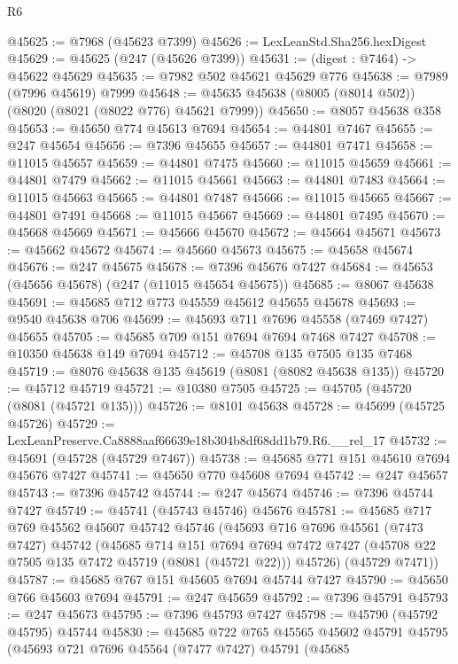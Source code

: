 \begin{lexlean}{R6}
\begin{coremodule}
@45625 := @7968 (@45623 @7399)
@45626 := LexLeanStd.Sha256.hexDigest
@45629 := @45625 (@247 (@45626 @7399))
@45631 := (digest : @7464) -> @45622 @45629
@45635 := @7982 @502 @45621 @45629 @776
@45638 := @7989 (@7996 @45619) @7999
@45648 := @45635 @45638 (@8005 (@8014 @502)) (@8020 (@8021 (@8022 @776) @45621 @7999))
@45650 := @8057 @45638 @358
@45653 := @45650 @774 @45613 @7694
@45654 := @44801 @7467
@45655 := @247 @45654
@45656 := @7396 @45655
@45657 := @44801 @7471
@45658 := @11015 @45657
@45659 := @44801 @7475
@45660 := @11015 @45659
@45661 := @44801 @7479
@45662 := @11015 @45661
@45663 := @44801 @7483
@45664 := @11015 @45663
@45665 := @44801 @7487
@45666 := @11015 @45665
@45667 := @44801 @7491
@45668 := @11015 @45667
@45669 := @44801 @7495
@45670 := @45668 @45669
@45671 := @45666 @45670
@45672 := @45664 @45671
@45673 := @45662 @45672
@45674 := @45660 @45673
@45675 := @45658 @45674
@45676 := @247 @45675
@45678 := @7396 @45676 @7427
@45684 := @45653 (@45656 @45678) (@247 (@11015 @45654 @45675))
@45685 := @8067 @45638
@45691 := @45685 @712 @773 @45559 @45612 @45655 @45678
@45693 := @9540 @45638 @706
@45699 := @45693 @711 @7696 @45558 (@7469 @7427) @45655
@45705 := @45685 @709 @151 @7694 @7694 @7468 @7427
@45708 := @10350 @45638 @149 @7694
@45712 := @45708 @135 @7505 @135 @7468
@45719 := @8076 @45638 @135 @45619 (@8081 (@8082 @45638 @135))
@45720 := @45712 @45719
@45721 := @10380 @7505
@45725 := @45705 (@45720 (@8081 (@45721 @135)))
@45726 := @8101 @45638
@45728 := @45699 (@45725 @45726)
@45729 := LexLeanPreserve.Ca8888aaf66639e18b304b8df68dd1b79.R6.__rel_17
@45732 := @45691 (@45728 (@45729 @7467))
@45738 := @45685 @771 @151 @45610 @7694 @45676 @7427
@45741 := @45650 @770 @45608 @7694
@45742 := @247 @45657
@45743 := @7396 @45742
@45744 := @247 @45674
@45746 := @7396 @45744 @7427
@45749 := @45741 (@45743 @45746) @45676
@45781 := @45685
    @717
    @769
    @45562
    @45607
    @45742
    @45746
    (@45693
      @716
      @7696
      @45561
      (@7473 @7427)
      @45742
      (@45685
        @714
        @151
        @7694
        @7694
        @7472
        @7427
        (@45708 @22 @7505 @135 @7472 @45719 (@8081 (@45721 @22)))
        @45726)
      (@45729 @7471))
@45787 := @45685 @767 @151 @45605 @7694 @45744 @7427
@45790 := @45650 @766 @45603 @7694
@45791 := @247 @45659
@45792 := @7396 @45791
@45793 := @247 @45673
@45795 := @7396 @45793 @7427
@45798 := @45790 (@45792 @45795) @45744
@45830 := @45685
    @722
    @765
    @45565
    @45602
    @45791
    @45795
    (@45693
      @721
      @7696
      @45564
      (@7477 @7427)
      @45791
      (@45685

\end{coremodule}
\end{lexlean}
